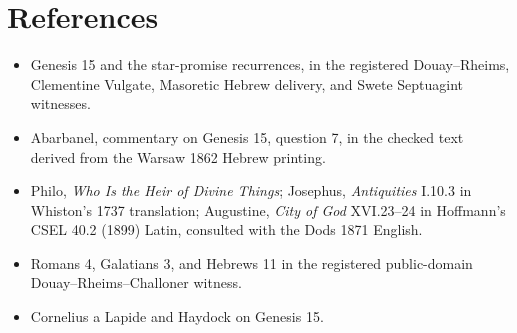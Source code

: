 \section{References}
\begin{itemize}
\item Genesis 15 and the star-promise recurrences, in the registered
Douay--Rheims, Clementine Vulgate, Masoretic Hebrew delivery, and Swete
Septuagint witnesses.
\item Abarbanel, commentary on Genesis 15, question 7, in the checked text
derived from the Warsaw 1862 Hebrew printing.
\item Philo, \emph{Who Is the Heir of Divine Things}; Josephus,
\emph{Antiquities} I.10.3 in Whiston's 1737 translation; Augustine,
\emph{City of God} XVI.23--24 in Hoffmann's CSEL 40.2 (1899) Latin,
consulted with the Dods 1871 English.
\item Romans 4, Galatians 3, and Hebrews 11 in the registered public-domain
Douay--Rheims--Challoner witness.
\item Cornelius a Lapide and Haydock on Genesis 15.
\end{itemize}


